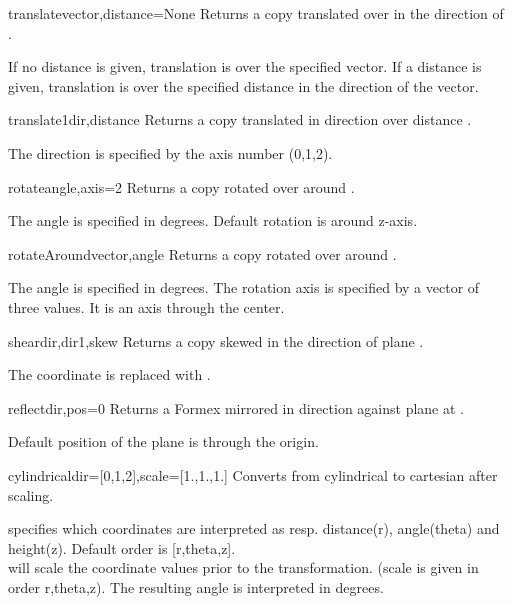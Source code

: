 {{\begin{methoddesc}  {translate}{vector,distance=None}
Returns a copy translated over  in the direction of .

If no distance is given, translation is over the specified vector. If a distance is given, translation is over the specified distance in the direction of the vector.
\end{methoddesc}

\begin{methoddesc}  {translate1}{dir,distance}
Returns a copy translated in direction  over distance . 

The direction is specified by the axis number (0,1,2).
\end{methoddesc}

\begin{methoddesc}  {rotate}{angle,axis=2}
Returns a copy rotated over  around .

The angle is specified in degrees. Default rotation is around z-axis.
\end{methoddesc}

\begin{methoddesc}  {rotateAround}{vector,angle}
Returns a copy rotated over  around .

The angle is specified in degrees. The rotation axis is specified by a vector of three values. It is an axis through the center.
\end{methoddesc}

\begin{methoddesc}  {shear}{dir,dir1,skew}
Returns a copy skewed in the direction  of plane .

The coordinate  is replaced with .
\end{methoddesc}

\begin{methoddesc}  {reflect}{dir,pos=0}
Returns a Formex mirrored in direction  against plane at .

Default position of the plane is through the origin.
\end{methoddesc}

\begin{methoddesc}  {cylindrical}{dir=[0,1,2],scale=[1.,1.,1.]}
Converts from cylindrical to cartesian after scaling.

 specifies which coordinates are interpreted as resp. distance(r), angle(theta) and height(z). Default order is [r,theta,z].\\
 will scale the coordinate values prior to the transformation. (scale is given in order r,theta,z). The resulting angle is interpreted in degrees.
\end{methoddesc}

}}
